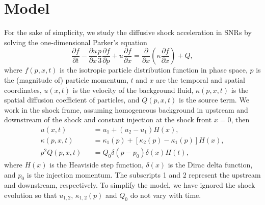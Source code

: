 \documentclass[apj]{emulateapj}
\begin{document}
\section{Model}\label{sec2}
For the sake of simplicity, we study the diffusive shock acceleration in SNRs by solving the one-dimensional Parker's equation \citep{1983RPPh...46..973D}
\begin{equation}
\frac{\partial f}{\partial t}-\frac{\partial u}{\partial x}\frac{p}{3}\frac{\partial f}{\partial p}+u\frac{\partial f}{\partial x}=\frac{\partial}{\partial x}\left( \kappa \frac{\partial f}{\partial x} \right) +Q,\label{e1}
\end{equation}
where $ f\left( p,x,t\right)  $ is the isotropic particle distribution function in phase space, $ p $ is the (magnitude of) particle momentum, $ t $ and $ x $ are the temporal and spatial coordinates, $ u\left( x,t\right) $ is the velocity of the background fluid, $\kappa \left( p,x,t\right) $ is the spatial diffusion coefficient of particles, and $ Q\left( p,x,t\right) $ is the source term.
We work in the shock frame, assuming homogeneous background in upstream and downstream of the shock and constant injection at the shock front $ x=0 $, then
\begin{eqnarray}
u\left( x,t\right) &&=u_1+\left( u_2-u_1\right) H\left( x\right) ,\label{e2}\\
\kappa\left( p,x,t\right) &&=\kappa _1\left( p \right) +\left[ \kappa _2\left( p \right) -\kappa _1\left( p \right) \right] H\left( x \right) ,\label{e3}\\
p^2Q\left( p,x,t\right) &&=Q_0\delta \left( p-p_0 \right) \delta \left( x \right) H\left( t \right) ,\label{e4}
\end{eqnarray}
where $ H\left( x \right) $ is the Heaviside step function, $ \delta \left( x \right) $ is the Dirac delta function, and $ p_0 $ is the injection momentum. The subscripts 1 and 2 represent the upstream and downstream, respectively. To simplify the model, we have ignored the shock evolution so that $ u_{1,2} $, $ \kappa_{1,2}\left( p\right) $ and $ Q_0 $ do not vary with time.
\end{document}
